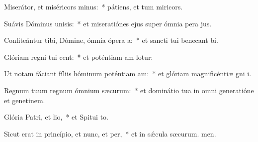 \item Miserátor, et miséricors minus:~* pátiens, et tum miricors.
\item Suávis Dóminus unisis:~* et miseratiónes ejus super ómnia pera jus.
\item Confiteántur tibi, Dómine, ómnia ópera a:~* et sancti tui benecant bi.
\item Glóriam regni tui cent:~* et poténtiam am lotur:
\item Ut notam fáciant fíliis hóminum poténtiam am:~* et glóriam magnificéntiæ gni i.
\item Regnum tuum regnum ómnium sæcurum:~* et dominátio tua in omni generatióne et genetinem.
\item Glória Patri, et lio,~* et Spitui to.
\item Sicut erat in princípio, et nunc, et per,~* et in sǽcula sæcurum. men.
